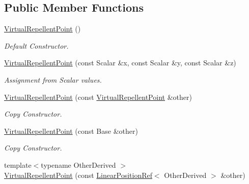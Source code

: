 \subsection*{Public Member Functions}
\begin{DoxyCompactItemize}
\item 
\hyperlink{classow__core_1_1VirtualRepellentPoint_af4f015e1c196145d40eb534f6b16a62a}{Virtual\+Repellent\+Point} ()\hypertarget{classow__core_1_1VirtualRepellentPoint_af4f015e1c196145d40eb534f6b16a62a}{}\label{classow__core_1_1VirtualRepellentPoint_af4f015e1c196145d40eb534f6b16a62a}

\begin{DoxyCompactList}\small\item\em Default Constructor. \end{DoxyCompactList}\item 
\hyperlink{classow__core_1_1VirtualRepellentPoint_a97892d3e1a040c3f7285414257f965d2}{Virtual\+Repellent\+Point} (const Scalar \&x, const Scalar \&y, const Scalar \&z)\hypertarget{classow__core_1_1VirtualRepellentPoint_a97892d3e1a040c3f7285414257f965d2}{}\label{classow__core_1_1VirtualRepellentPoint_a97892d3e1a040c3f7285414257f965d2}

\begin{DoxyCompactList}\small\item\em Assignment from Scalar values. \end{DoxyCompactList}\item 
\hyperlink{classow__core_1_1VirtualRepellentPoint_a7bd26ba5b85db8073a07255b9681288e}{Virtual\+Repellent\+Point} (const \hyperlink{classow__core_1_1VirtualRepellentPoint}{Virtual\+Repellent\+Point} \&other)\hypertarget{classow__core_1_1VirtualRepellentPoint_a7bd26ba5b85db8073a07255b9681288e}{}\label{classow__core_1_1VirtualRepellentPoint_a7bd26ba5b85db8073a07255b9681288e}

\begin{DoxyCompactList}\small\item\em Copy Constructor. \end{DoxyCompactList}\item 
\hyperlink{classow__core_1_1VirtualRepellentPoint_ad5c75c5d188988e85bc5d8f11980d9be}{Virtual\+Repellent\+Point} (const Base \&other)\hypertarget{classow__core_1_1VirtualRepellentPoint_ad5c75c5d188988e85bc5d8f11980d9be}{}\label{classow__core_1_1VirtualRepellentPoint_ad5c75c5d188988e85bc5d8f11980d9be}

\begin{DoxyCompactList}\small\item\em Copy Constructor. \end{DoxyCompactList}\item 
{\footnotesize template$<$typename Other\+Derived $>$ }\\\hyperlink{classow__core_1_1VirtualRepellentPoint_a0bf2b519e14881e818948ad946961cf6}{Virtual\+Repellent\+Point} (const \hyperlink{classow__core_1_1LinearPositionRef}{Linear\+Position\+Ref}$<$ Other\+Derived $>$ \&other)\hypertarget{classow__core_1_1VirtualRepellentPoint_a0bf2b519e14881e818948ad946961cf6}{}\label{classow__core_1_1VirtualRepellentPoint_a0bf2b519e14881e818948ad946961cf6}


\end{DoxyCompactItemize}
